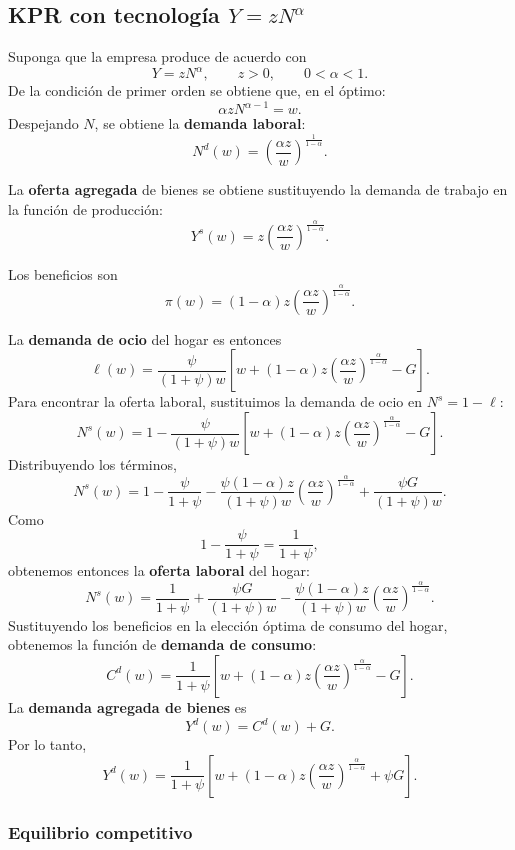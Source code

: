 \documentclass[11pt]{article}
\begin{document}
\subsection{KPR con tecnología $Y=zN^\alpha$}

Suponga que la empresa produce de acuerdo con
\[
Y=zN^\alpha,
\qquad
z>0,
\qquad
0<\alpha<1.
\]
De la condición de primer orden se obtiene que, en el óptimo:
\[
\alpha zN^{\alpha-1}=w.
\]
Despejando $N$, se obtiene la \textbf{demanda laboral}:
\[
\boxed{
N^d(w)
=
\left(
\frac{\alpha z}{w}
\right)^{\frac{1}{1-\alpha}}
}.
\]

La \textbf{oferta agregada} de bienes se obtiene sustituyendo la demanda de trabajo en la función de producción:
\[
\boxed{
Y^s(w)
=
z
\left(
\frac{\alpha z}{w}
\right)^{\frac{\alpha}{1-\alpha}}
}.
\]

Los beneficios son
\[
\boxed{
\pi(w)
=
(1-\alpha)z
\left(
\frac{\alpha z}{w}
\right)^{\frac{\alpha}{1-\alpha}}
}.
\]

La \textbf{demanda de ocio} del hogar es entonces
\[
\boxed{
\ell(w)
=
\frac{\psi}{(1+\psi)w}
\left[
w+
(1-\alpha)z
\left(
\frac{\alpha z}{w}
\right)^{\frac{\alpha}{1-\alpha}}
-G
\right]
}.
\]
Para encontrar la oferta laboral, sustituimos la demanda de ocio en $N^s=1-\ell$:
\[
N^s(w)
=
1-
\frac{\psi}{(1+\psi)w}
\left[
w+
(1-\alpha)z
\left(
\frac{\alpha z}{w}
\right)^{\frac{\alpha}{1-\alpha}}
-G
\right].
\]
Distribuyendo los términos,
\[
N^s(w)
=
1
-
\frac{\psi}{1+\psi}
-
\frac{\psi(1-\alpha)z}{(1+\psi)w}
\left(
\frac{\alpha z}{w}
\right)^{\frac{\alpha}{1-\alpha}}
+
\frac{\psi G}{(1+\psi)w}.
\]
Como
\[
1-\frac{\psi}{1+\psi}
=
\frac{1}{1+\psi},
\]
obtenemos entonces la \textbf{oferta laboral} del hogar:
\[
\boxed{
N^s(w)
=
\frac{1}{1+\psi}
+
\frac{\psi G}{(1+\psi)w}
-
\frac{\psi(1-\alpha)z}{(1+\psi)w}
\left(
\frac{\alpha z}{w}
\right)^{\frac{\alpha}{1-\alpha}}
}.
\]
Sustituyendo los beneficios en la elección óptima de consumo del hogar, obtenemos la función de \textbf{demanda de consumo}:
\[
\boxed{
C^d(w)
=
\frac{1}{1+\psi}
\left[
w+
(1-\alpha)z
\left(
\frac{\alpha z}{w}
\right)^{\frac{\alpha}{1-\alpha}}
-G
\right]
}.
\]
La \textbf{demanda agregada de bienes} es
\[
Y^d(w)=C^d(w)+G.
\]
Por lo tanto,
\[
\boxed{
Y^d(w)
=
\frac{1}{1+\psi}
\left[
w+
(1-\alpha)z
\left(
\frac{\alpha z}{w}
\right)^{\frac{\alpha}{1-\alpha}}
+\psi G
\right]
}.
\]


\subsubsection*{Equilibrio competitivo}
\end{document}
